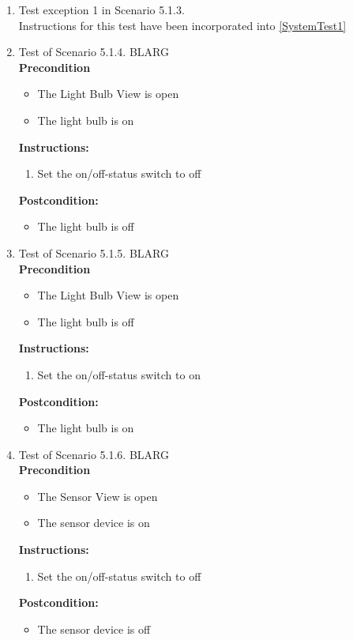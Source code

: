 \documentclass[a4paper]{article}
\newlength{\testlabellength}
\newenvironment{testlist}{\begin{enumerate}[label=\bfseries Instruction \thesubsection.\arabic* , labelindent=0pt, labelwidth=\testlabellength , leftmargin=2cm]}{\end{enumerate}}
\newenvironment{precondition}{
{\color{white}BLARG}\\ 
\textbf{Precondition}
\begin{itemize}[labelindent=0cm, labelwidth=2cm , leftmargin=1cm]
}
{\end{itemize}}
\newenvironment{instruction}{
\textbf{Instructions:}
\begin{enumerate}[label=\bfseries  \arabic*., labelindent=0cm, labelwidth=2cm , leftmargin=1cm]
}
{\end{enumerate}}
\newenvironment{postcondition}{
\textbf{Postcondition:}
\begin{itemize}[labelindent=0cm, labelwidth=2cm , leftmargin=1cm]
}
{\end{itemize}}
\begin{document}
\begin{appendices}
\begin{testlist}
	\item  Test exception 1 in Scenario 5.1.3. \\
		Instructions for this test have been incorporated into \ref{SystemTest1}

	\item  Test of Scenario 5.1.4.
		\begin{precondition}
			\item The Light Bulb View is open
			\item The light bulb is on
		\end{precondition}
		\begin{instruction}
			\item Set the on/off-status switch to off
		\end{instruction}
		\begin{postcondition}
			\item The light bulb is off
		\end{postcondition}
\newpage
	\item  Test of Scenario 5.1.5.
		\begin{precondition}
			\item The Light Bulb View is open
			\item The light bulb is off
		\end{precondition}
		\begin{instruction}
			\item Set the on/off-status switch to on
		\end{instruction}
		\begin{postcondition}
			\item The light bulb is on
		\end{postcondition}

	\item  Test of Scenario 5.1.6.
		\begin{precondition}
			\item The Sensor View is open
			\item The sensor device is on
		\end{precondition}
		\begin{instruction}
			\item Set the on/off-status switch to off
		\end{instruction}
		\begin{postcondition}
			\item The sensor device is off
		\end{postcondition}


\end{testlist}
\end{appendices}
\end{document}
